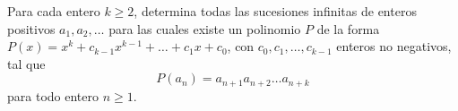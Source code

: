 Para cada entero $k \geq 2$, determina todas las sucesiones infinitas de enteros positivos $a_1,a_2,\dots$ para las cuales existe un polinomio $P$ de la forma $P(x) = x^k + c_{k-1}x^{k-1} + \dots + c_1x + c_0$, con $c_0,c_1,\dots,c_{k-1}$ enteros no negativos, tal que
\[P(a_n)=a_{n+1}a_{n+2}\dots a_{n+k}\]
para todo entero $n \geq 1$.